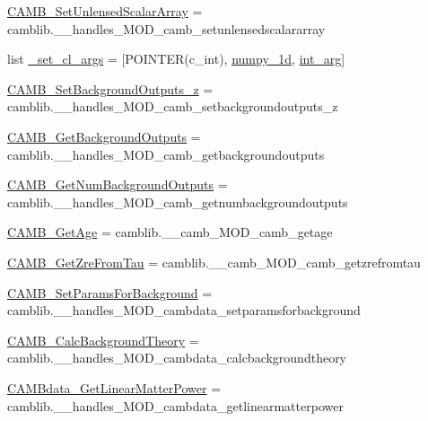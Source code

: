 \begin{DoxyCompactItemize}
\item 
\mbox{\hyperlink{namespacecamb_1_1camb_a18bd5059fd4e3231b2666adc00d1a943}{C\+A\+M\+B\+\_\+\+Set\+Unlensed\+Scalar\+Array}} = camblib.\+\_\+\+\_\+handles\+\_\+\+M\+O\+D\+\_\+camb\+\_\+setunlensedscalararray
\item 
list \mbox{\hyperlink{namespacecamb_1_1camb_a95c9caf61a082f47bb7a766bf503e601}{\+\_\+set\+\_\+cl\+\_\+args}} = \mbox{[}P\+O\+I\+N\+T\+ER(c\+\_\+int), \mbox{\hyperlink{namespacecamb_1_1camb_a3d113b2f49bb7733dfa37b76ea4da9b0}{numpy\+\_\+1d}}, \mbox{\hyperlink{namespacecamb_1_1camb_a9e194516acd41f6579011e26d65a6d73}{int\+\_\+arg}}\mbox{]}
\item 
\mbox{\hyperlink{namespacecamb_1_1camb_a80a10f91d36048f57e81460f37e6d427}{C\+A\+M\+B\+\_\+\+Set\+Background\+Outputs\+\_\+z}} = camblib.\+\_\+\+\_\+handles\+\_\+\+M\+O\+D\+\_\+camb\+\_\+setbackgroundoutputs\+\_\+z
\item 
\mbox{\hyperlink{namespacecamb_1_1camb_a432459b4f0dfc0b730e0d45df8f00768}{C\+A\+M\+B\+\_\+\+Get\+Background\+Outputs}} = camblib.\+\_\+\+\_\+handles\+\_\+\+M\+O\+D\+\_\+camb\+\_\+getbackgroundoutputs
\item 
\mbox{\hyperlink{namespacecamb_1_1camb_aa431a5cd751bd35f7a2c43709be691ad}{C\+A\+M\+B\+\_\+\+Get\+Num\+Background\+Outputs}} = camblib.\+\_\+\+\_\+handles\+\_\+\+M\+O\+D\+\_\+camb\+\_\+getnumbackgroundoutputs
\item 
\mbox{\hyperlink{namespacecamb_1_1camb_abccf0c9bc3a9f4aa615ead2675fef679}{C\+A\+M\+B\+\_\+\+Get\+Age}} = camblib.\+\_\+\+\_\+camb\+\_\+\+M\+O\+D\+\_\+camb\+\_\+getage
\item 
\mbox{\hyperlink{namespacecamb_1_1camb_ae0fae3fa009c3c9a5f8c6b337b82680e}{C\+A\+M\+B\+\_\+\+Get\+Zre\+From\+Tau}} = camblib.\+\_\+\+\_\+camb\+\_\+\+M\+O\+D\+\_\+camb\+\_\+getzrefromtau
\item 
\mbox{\hyperlink{namespacecamb_1_1camb_abdb9d21c561161d480452cffa7450a0f}{C\+A\+M\+B\+\_\+\+Set\+Params\+For\+Background}} = camblib.\+\_\+\+\_\+handles\+\_\+\+M\+O\+D\+\_\+cambdata\+\_\+setparamsforbackground
\item 
\mbox{\hyperlink{namespacecamb_1_1camb_a0f92c05c3c1ec332202aae9ae947fd85}{C\+A\+M\+B\+\_\+\+Calc\+Background\+Theory}} = camblib.\+\_\+\+\_\+handles\+\_\+\+M\+O\+D\+\_\+cambdata\+\_\+calcbackgroundtheory
\item 
\mbox{\hyperlink{namespacecamb_1_1camb_ac6119aa339302145f81e871c06583a84}{C\+A\+M\+Bdata\+\_\+\+Get\+Linear\+Matter\+Power}} = camblib.\+\_\+\+\_\+handles\+\_\+\+M\+O\+D\+\_\+cambdata\+\_\+getlinearmatterpower

\end{DoxyCompactItemize}
